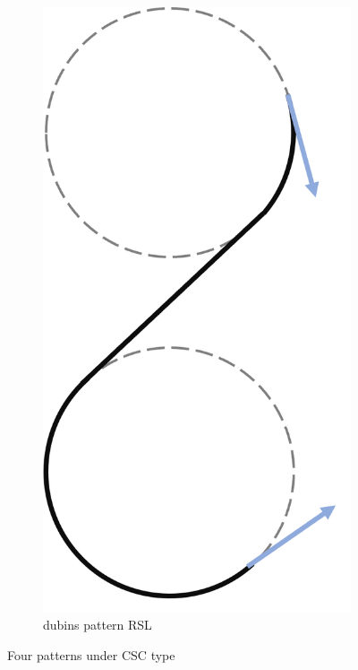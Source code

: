 \begin{figure}
\begin{subfigure}[b]{0.2\textwidth}
         \centering
         \includegraphics[scale=0.7]{fig/dubins/RSL.png}
         \caption{dubins pattern RSL}
         \label{fig:dubins pattern RSL}
     \end{subfigure}
        \caption{Four patterns under CSC type }
        \label{fig:dubins pattern CSC}
\end{figure}

